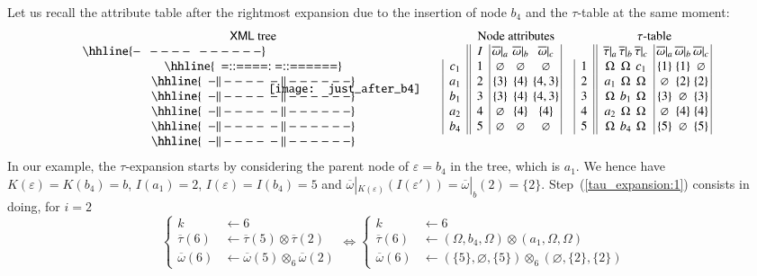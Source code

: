 Let us recall the attribute table after the rightmost expansion due to
the insertion of node \(b_4\) and the \(\tau\)-table at the same
moment:
\[
\begin{array}{cc|c||c|@{\,}c@{\,}@{\,}c@{\,}@{\,}c@{\,}|c|c||c@{\,}c@{\,}c|@{\,}c@{\,}c@{\,}c@{\,}|}
  \text{\XML tree} 
& \multicolumn{2}{c}{} 
& \multicolumn{4}{c}{\text{Node attributes}} 
& \multicolumn{2}{c}{}
& \multicolumn{6}{c}{\tau\text{-table}}\\
\hhline{-~~----~~------}
\multirow{6}{*}{
\texttt{[image: just\_after\_b4]}
}
& \multicolumn{2}{c||}{} 
& I 
& \overline{\omega}|_a & \overline{\omega}|_b & \overline{\omega}|_c
& \multicolumn{2}{c||}{} 
& \overline{\tau}|_a & \overline{\tau}|_b & \overline{\tau}|_c 
& \overline{\omega}|_a & \overline{\omega}|_b & \overline{\omega}|_c\\
\hhline{~~=::====:~=::======}
&& c_1 & 1 & \varnothing & \varnothing & \varnothing & & 
1 & \Omega & \Omega & c_1 & \{1\} & \{1\} & \varnothing\\
\hhline{~~-||----~-||------}
&& a_1 & 2 & \{3\} & \{4\} & \{4, 3\} & & 
2 & a_1 & \Omega & \Omega & \varnothing & \{2\} & \{2\}\\
\hhline{~~-||----~-||------}
&& b_1 & 3 & \{3\} & \{4\} & \{4, 3\} & & 
3 & \Omega & b_1 & \Omega & \{3\} & \varnothing & \{3\}\\
\hhline{~~-||----~-||------}
&& a_2 & 4 & \varnothing & \{4\} & \{4\} & & 
4 & a_2 & \Omega & \Omega & \varnothing & \{4\} & \{4\}\\
\hhline{~~-||----~-||------}
&& b_4 & 5 & \varnothing & \varnothing & \varnothing & & 
5 & \Omega & b_4 & \Omega & \{5\} & \varnothing & \{5\}\\
\hhline{~~-||----~-||------}
\end{array}
\]
In our example, the \(\tau\)-expansion starts by considering the
parent node of \(\varepsilon = b_4\) in the \XML tree, which is \(a_1\). We
hence have \(K(\varepsilon) = K(b_4) = b\), \(I(a_1) = 2\), \(I(\varepsilon) = I(b_4)
= 5\) and \(\overline{\omega}|_{K(\varepsilon)}(I(\varepsilon')) =
\overline{\omega}|_b(2) = \{2\}\). Step~(\ref{tau_expansion:1})
consists in doing, for \(i = 2\)
\[
\left\{
\begin{aligned}
  k &\leftarrow 6\\
  \overline{\tau}(6) & \leftarrow \overline{\tau}(5) \otimes
  \overline{\tau}(2)\\
  \overline{\omega}(6) &\leftarrow \overline{\omega}(5) \otimes_{6}
  \overline{\omega}(2) 
\end{aligned}
\right.
\Longleftrightarrow
\left\{
\begin{aligned}
  k &\leftarrow 6\\
  \overline{\tau}(6) & \leftarrow  (\Omega, b_4, \Omega) \otimes (a_1,
  \Omega, \Omega)\\
  \overline{\omega}(6) &\leftarrow (\{5\}, \varnothing, \{5\})
  \otimes_6 (\varnothing, \{2\}, \{2\})
\end{aligned}
\right.
\]
